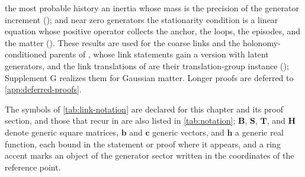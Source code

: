 the most probable history an inertia whose mass is the precision of the generator increment
(); and near zero generators the stationarity
condition is a linear equation whose positive operator collects the anchor, the loops, the episodes,
and the matter (). These results are used for the coarse links and
the holonomy-conditioned parents of , whose link
statements gain a version with latent generators, and the link translations of
 are their translation-group instance
(); Supplement G realizes them for Gaussian matter. Longer proofs
are deferred to \cref{app:deferred-proofs}.

The symbols of \cref{tab:link-notation} are declared for this chapter and its proof section, and those
that recur in  are also listed in \cref{tab:notation};
$\mathbf B$, $\mathbf S$, $\mathbf T$, and $\mathbf H$ denote generic square matrices, $\mathbf b$ and
$\mathbf c$ generic vectors, and $\mathbf h$ a generic real function, each bound in the statement or proof
where it appears, and a ring accent marks an object of the generator sector written in the coordinates of
the reference point.

